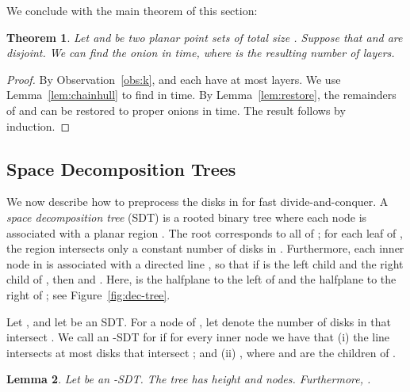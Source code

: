 \documentclass{paper}
\newtheorem{theorem}{Theorem}[section]
\newtheorem{lemma}[theorem]{Lemma}
\begin{document}
\noindent
We conclude with the main theorem of this section:

\begin{theorem}\label{thm:ounion}
  Let  and  be two planar point sets of total size .
  Suppose that  and  are disjoint.
  We can find the onion  in  
  time,
  where  is the resulting number of layers.
\end{theorem}

\begin{proof}
  By Observation~\ref{obs:k},  and  each have at most 
   layers.
  We use Lemma~\ref{lem:chainhull} to find  
  in  time.
  By Lemma~\ref{lem:restore}, the remainders of 
   and  can be restored to 
  proper onions in  time.
  The result follows by induction.
\end{proof}


\subsection{Space Decomposition Trees}

We now describe how to preprocess the disks in 
for fast divide-and-conquer. 
A \emph{space decomposition tree} (SDT)  
is a rooted binary tree where each node  is associated with a planar region
. The root corresponds to all of ; for each leaf 
 of , the region  intersects only a constant number of
disks in .
Furthermore, each inner node  in  is associated with a directed line
, so that if  is the left child and  the right
child of , then  and 
. Here,  is the 
halfplane to the left of  and  the halfplane
to the right of ; see Figure~\ref{fig:dec-tree}.

Let , and let  be an SDT.
For a node  of , let  denote the number of disks in  that
intersect . We call  an -SDT
for  if for every inner node  we have that
(i) the line  intersects at most  disks that intersect
; and (ii) , where  and  are the children
of .


\begin{lemma}\label{lem:tree_complexity}
Let  be an -SDT. The tree  has height  and
 nodes.
Furthermore, .
\end{lemma}
\end{document}
